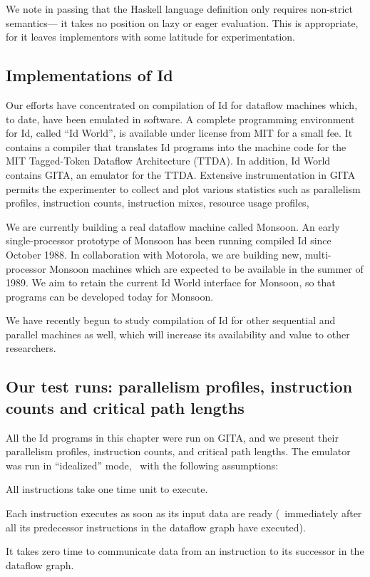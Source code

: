 We note in passing that the Haskell language definition only requires
non-strict semantics--- it takes no position on lazy or eager
evaluation.  This is appropriate, for it leaves implementors with some
latitude for experimentation.

\subsection{Implementations of Id}
 
Our efforts have concentrated on compilation of Id for dataflow
machines which, to date, have been emulated in software.  A complete
programming environment for Id, called ``Id World'', is available
under license from MIT for a small fee.  It contains a compiler that
translates Id programs into the machine code for the MIT Tagged-Token
Dataflow Architecture (TTDA).  In addition, Id World contains GITA, an
emulator for the TTDA.  Extensive instrumentation in GITA permits the
experimenter to collect and plot various statistics such as
parallelism profiles, instruction counts, instruction mixes, resource
usage profiles, \etc\

We are currently building a real dataflow machine called Monsoon.  An
early single-processor prototype of Monsoon has been running compiled
Id since October 1988.  In collaboration with Motorola, we are
building new, multi-processor Monsoon machines which are expected to
be available in the summer of 1989.  We aim to retain the current Id
World interface for Monsoon, so that programs can be developed today
for Monsoon.

We have recently begun to study compilation of Id for other sequential
and parallel machines as well, which will increase its availability
and value to other researchers.

\subsection{Our test runs: parallelism profiles, instruction counts and critical path lengths}

All the Id programs in this chapter were run on GITA, and we present
their parallelism profiles, instruction counts, and critical path
lengths.  The emulator was run in ``idealized'' mode, \ie\ with the
following assumptions:

 \begin{tightlist}

\item
All instructions take one time unit to execute.

\item
Each instruction executes as soon as its input data are ready (\ie\
immediately after all its predecessor instructions in the dataflow
graph have executed).

\item
It takes zero time to communicate data from an instruction to its
successor in the dataflow graph.

 \end{tightlist}

